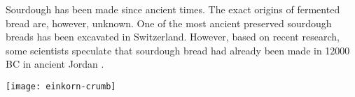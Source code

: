 Sourdough has been made since ancient times. The exact origins of fermented
bread are, however, unknown. One of the most ancient preserved
sourdough breads has been excavated in Switzerland.
However, based on recent research, some scientists speculate that sourdough
bread had already been made in 12000 BC in ancient Jordan \cite{jordan+bread}.

\texttt{[image: einkorn-crumb]}